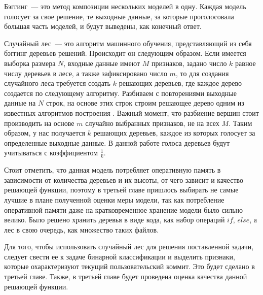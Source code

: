 Бэггинг~--- это метод композиции нескольких моделей в одну. Каждая модель голосует за свое решение, те выходные данные, за которые проголосовала большая часть моделей, и будут выведены, как конечный ответ.

Случайный лес~--- это алгоритм машинного обучения, представляющий из себя бэггинг деревьев решений. Происходит он следующим образом. Если имеется выборка размера $N$, входные данные имеют $M$ признаков, задано число $k$ равное числу деревьев в лесе, а также зафиксировано число $m$, то для создания случайного леса требуется создать $k$ решающих деревьев, где каждое дерево создается по следующему алгоритму. Разбиваем с повторениями выходные данные на $N$ строк, на основе этих строк строим решающее дерево одним из известных алгоритмов построения \cite{decision-tree}. Важный момент, что разбиение вершин стоит производить на основе $m$ случайно выбранных признаков, не на всех $M$. Таким образом, у нас получается $k$ решающих деревьев, каждое из которых голосует за определенные выходные данные. В данной работе голоса деревьев будут учитываться с коэффициентом $\frac{1}{k}$.

Стоит отметить, что данная модель потребляет оперативную память в зависимости от количества деревьев и их высоты, от чего зависит и качество решающей функции, поэтому в третьей главе пришлось выбирать не самые лучшие в плане полученной оценки меры модели, так как потребление оперативной памяти даже на кратковременное хранение модели было сильно велико. Было решено хранить деревья в виде кода, как набор операций $if$, $else$, а лес в свою очередь, как множество таких файлов.

Для того, чтобы использовать случайный лес для решения поставленной задачи, следует свести ее к задаче бинарной классификации и выделить признаки, которые охарактеризуют текущий пользовательский коммит. Это будет сделано в третьей главе. Также, в третьей главе будет проведена оценка качества данной решающей функции.

